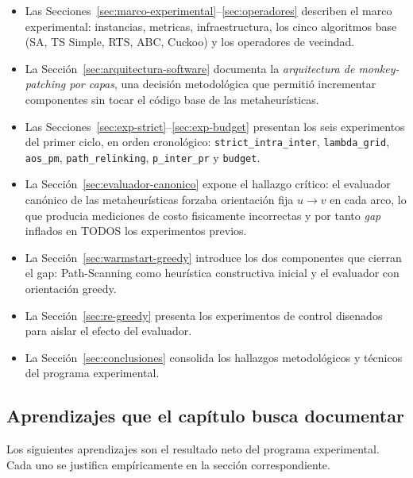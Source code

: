 \begin{itemize}
\item Las Secciones~\ref{sec:marco-experimental}--\ref{sec:operadores}
  describen el marco experimental: instancias, metricas,
  infraestructura, los cinco algoritmos base (SA, TS Simple, RTS, ABC,
  Cuckoo) y los operadores de vecindad.
\item La Sección~\ref{sec:arquitectura-software} documenta la
  \emph{arquitectura de monkey-patching por capas}, una decisión
  metodológica que permitió incrementar componentes sin tocar el
  código base de las metaheurísticas.
\item Las Secciones~\ref{sec:exp-strict}--\ref{sec:exp-budget}
  presentan los seis experimentos del primer ciclo, en orden
  cronológico: \texttt{strict\_intra\_inter},
  \texttt{lambda\_grid}, \texttt{aos\_pm}, \texttt{path\_relinking},
  \texttt{p\_inter\_pr} y \texttt{budget}.
\item La Sección~\ref{sec:evaluador-canonico} expone el hallazgo
  crítico: el evaluador canónico de las metaheurísticas forzaba
  orientación fija $u \to v$ en cada arco, lo que producia
  mediciones de costo fisicamente incorrectas y por tanto \emph{gap}
  inflados en TODOS los experimentos previos.
\item La Sección~\ref{sec:warmstart-greedy} introduce los dos
  componentes que cierran el gap: Path-Scanning como heurística
  constructiva inicial y el evaluador con orientación greedy.
\item La Sección~\ref{sec:re-greedy} presenta los experimentos de
  control disenados para aislar el efecto del evaluador.
\item La Sección~\ref{sec:conclusiones} consolida los hallazgos
  metodológicos y técnicos del programa experimental.
\end{itemize}

\subsection{Aprendizajes que el capítulo busca documentar}

Los siguientes aprendizajes son el resultado neto del programa
experimental. Cada uno se justifica empíricamente en la sección
correspondiente.

